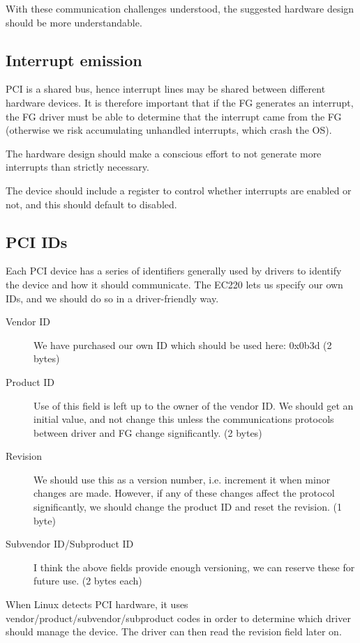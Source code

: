 \documentclass[12pt]{article}
\begin{document}
With these communication challenges understood, the suggested hardware design should be more understandable.

\subsection{Interrupt emission}

PCI is a shared bus, hence interrupt lines may be shared between different hardware devices. It is therefore important that if the FG generates an interrupt, the FG driver must be able to determine that the interrupt came from the FG (otherwise we risk accumulating unhandled interrupts, which crash the OS).

The hardware design should make a conscious effort to not generate more interrupts than strictly necessary.

The device should include a register to control whether interrupts are enabled or not, and this should default to disabled.

\subsection{PCI IDs}

Each PCI device has a series of identifiers generally used by drivers to identify the device and how it should communicate. The EC220 lets us specify our own IDs, and we should do so in a driver-friendly way.

\begin{description}
\item[Vendor ID] We have purchased our own ID which should be used here: 0x0b3d (2 bytes)
\item[Product ID] Use of this field is left up to the owner of the vendor ID. We should get an initial value, and not change this unless the communications protocols between driver and FG change significantly. (2 bytes)
\item[Revision] We should use this as a version number, i.e. increment it when minor changes are made. However, if any of these changes affect the protocol significantly, we should change the product ID and reset the revision. (1 byte)
\item[Subvendor ID/Subproduct ID] I think the above fields provide enough versioning, we can reserve these for future use. (2 bytes each)
\end{description}

When Linux detects PCI hardware, it uses vendor/product/subvendor/subproduct codes in order to determine which driver should manage the device. The driver can then read the revision field later on.
\end{document}
